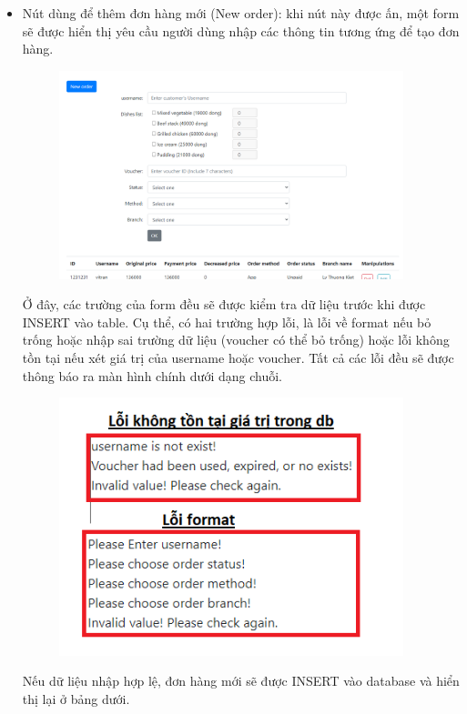 \documentclass[13pt,a4paper]{article}
\begin{document}
	\begin{itemize}
		\item Nút dùng để thêm đơn hàng mới (New order): khi nút này được ấn, một form sẽ được hiển thị yêu cầu người dùng nhập các thông tin tương ứng để tạo đơn hàng.
		\begin{figure}[h!]
			\begin{center}
				\includegraphics[width=10cm]{vitran/web_new_order.png}
			\end{center}
		\end{figure}
		Ở đây, các trường của form đều sẽ được kiểm tra dữ liệu trước khi được INSERT vào table. Cụ thể, có hai trường hợp lỗi, là lỗi về format nếu bỏ trống hoặc nhập sai trường dữ liệu (voucher có thể bỏ trống) hoặc lỗi không tồn tại nếu xét giá trị của username hoặc voucher. Tất cả các lỗi đều sẽ được thông báo ra màn hình chính dưới dạng chuỗi.
		\begin{figure}[h!]
			\begin{center}
				\includegraphics[width=10cm]{vitran/error_input.png}
			\end{center}
		\end{figure}
		\newpage
		Nếu dữ liệu nhập hợp lệ, đơn hàng mới sẽ được INSERT vào database và hiển thị lại ở bảng dưới.

\end{itemize}
\end{document}
